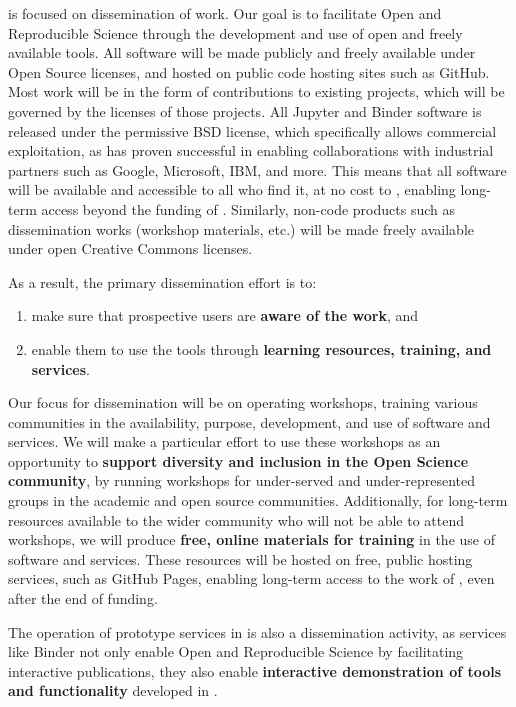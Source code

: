  is focused on dissemination of \TheProject work.
Our goal is to facilitate Open and Reproducible Science through the development and use of open and freely available tools.
All \TheProject software will be made publicly and freely available under Open Source licenses, and
hosted on public code hosting sites such as GitHub.
Most \TheProject work will be in the form of
contributions to existing projects,
which will be governed by the licenses of those projects.
All Jupyter and Binder software is released under the permissive BSD license,
which specifically allows commercial exploitation,
as has proven successful in enabling collaborations with industrial partners
such as Google, Microsoft, IBM, and more.
This means that all \TheProject software will be available and accessible to all who find it,
at no cost to \TheProject,
enabling long-term access beyond the funding of \TheProject.
Similarly, non-code products such as dissemination works
(workshop materials, etc.)
will be made freely available under open Creative Commons licenses.

As a result, the primary dissemination effort is to:

\begin{enumerate}
  \item make sure that prospective users are \textbf{aware of the work}, and
  \item enable them to use the tools through \textbf{learning resources, training, and services}.
\end{enumerate}

Our focus for dissemination will be on
operating workshops, training various communities in the availability,
purpose, development, and use of \TheProject software and services.
We will make a particular effort to use these workshops as an opportunity
to \textbf{support diversity and inclusion in the Open Science community},
by running workshops for under-served and under-represented groups in the academic and
open source communities.
Additionally, for long-term resources available to the wider community
who will not be able to attend workshops,
we will produce \textbf{free, online materials for training} in the use of \TheProject
software and services.
These resources will be hosted on free, public hosting services,
such as GitHub Pages,
enabling long-term access to the work of \TheProject,
even after the end of funding.

The operation of prototype services in  is also a dissemination activity,
as services like Binder not only enable Open and Reproducible Science by facilitating interactive publications,
they also enable \textbf{interactive demonstration of tools and functionality}
developed in \TheProject.

